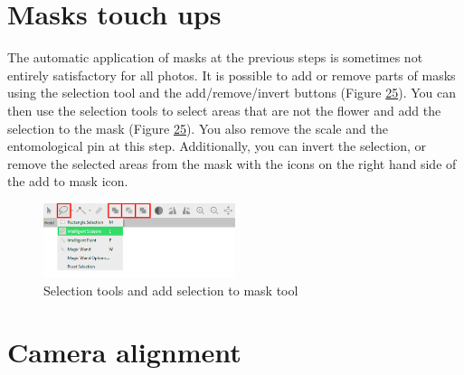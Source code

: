 \documentclass[
]{book}
\theoremstyle{definition}
\theoremstyle{definition}
\theoremstyle{definition}
\theoremstyle{definition}
\theoremstyle{remark}
\begin{document}
\hypertarget{masks-touch-ups}{%
\section{Masks touch ups}\label{masks-touch-ups}}

The automatic application of masks at the previous steps is sometimes
not entirely satisfactory for all photos. It is possible to add or
remove parts of masks using the selection tool and the add/remove/invert
buttons (Figure \protect\hyperlink{tools_masks}{25}). You can then use the selection tools to
select areas that are not the flower and add the selection to the mask
(Figure \protect\hyperlink{tools_masks}{25}). You also remove the scale and the
entomological pin at this step. Additionally, you can invert the
selection, or remove the selected areas from the mask with the icons on
the right hand side of the add to mask icon.

\begin{figure}
\hypertarget{tools_masks}{%
\centering
\includegraphics[width=0.5\textwidth,height=\textheight]{Figures/tools_masks.png}
\caption{Selection tools and add selection to mask
tool}\label{tools_masks}
}
\end{figure}

\hypertarget{camera-alignment}{%
\section{Camera alignment}\label{camera-alignment}}
\end{document}

